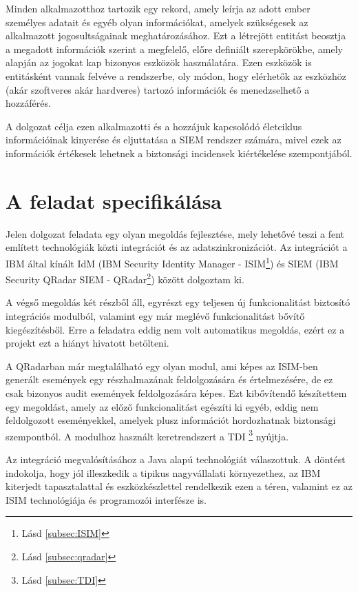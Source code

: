 Minden alkalmazotthoz tartozik egy rekord, amely leírja az adott ember személyes adatait és egyéb olyan információkat, amelyek szükségesek az alkalmazott jogosultságainak meghatározásához. Ezt a létrejött entitást beosztja a megadott információk szerint a megfelelő, előre definiált szerepkörökbe, amely alapján az jogokat kap bizonyos eszközök használatára. Ezen eszközök is entitásként vannak felvéve a rendszerbe, oly módon, hogy elérhetők az eszközhöz (akár szoftveres akár hardveres) tartozó információk és menedzselhető a hozzáférés.

A dolgozat célja ezen alkalmazotti és a hozzájuk kapcsolódó életciklus információinak kinyerése és eljuttatása a SIEM rendszer számára, mivel ezek az információk értékesek lehetnek a biztonsági incidensek kiértékelése szempontjából.

\section{A feladat specifikálása}

Jelen dolgozat feladata egy olyan megoldás fejlesztése, mely lehetővé teszi a fent említett technológiák közti integrációt és az adatszinkronizációt. Az integrációt a IBM által kínált IdM (IBM Security Identity Manager - ISIM\footnote{Lásd \ref{subsec:ISIM}}) és SIEM (IBM Security QRadar SIEM - QRadar\footnote{Lásd \ref{subsec:qradar}}) között dolgoztam ki.
 
A végső megoldás két részből áll, egyrészt egy teljesen új funkcionalitást biztosító integrációs modulból, valamint egy már meglévő funkcionalitást bővítő kiegészítésből. Erre a feladatra eddig nem volt automatikus megoldás, ezért ez a projekt ezt a hiányt hivatott betölteni.

A QRadarban már megtalálható egy olyan modul, ami képes az ISIM-ben generált események egy részhalmazának feldolgozására és értelmezésére, de ez csak bizonyos audit események feldolgozására képes. Ezt kibővítendő készítettem egy megoldást, amely az előző funkcionalitást egészíti ki egyéb, eddig nem feldolgozott eseményekkel, amelyek plusz információt hordozhatnak biztonsági szempontból. A modulhoz használt keretrendszert a TDI \footnote{\label{foot:TDI}Lásd \ref{subsec:TDI} } nyújtja.

Az integráció megvalósításához a Java alapú technológiát válaszottuk. A döntést indokolja, hogy jól illeszkedik a tipikus nagyvállalati környezethez, az IBM kiterjedt tapasztalattal és eszközkészlettel rendelkezik ezen a téren, valamint ez az ISIM technológiája és programozói interfésze is.

